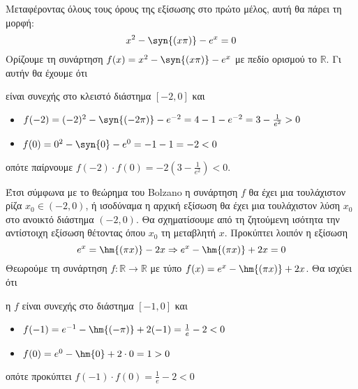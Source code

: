 \documentclass[11pt,a4paper]{article}
\begin{document}
Μεταφέροντας όλους τους όρους της εξίσωσης στο πρώτο μέλος, αυτή θα πάρει τη μορφή:
\[ x^2-\syn{(x\pi)}-e^x=0 \]
Ορίζουμε τη συνάρτηση $ f(x)=x^2-\syn{(x\pi)}-e^x $ με πεδίο ορισμού το $ \mathbb{R} $. Γι αυτήν θα έχουμε ότι
\begin{rlist}
\item είναι συνεχής στο κλειστό διάστημα $ [-2,0] $ και
\item \begin{itemize}
\item $ f(-2)=(-2)^2-\syn{(-2\pi)}-e^{-2}=4-1-e^{-2}=3-\frac{1}{e^2}>0 $
\item $ f(0)=0^2-\syn{0}-e^0=-1-1=-2<0 $
\end{itemize}
οπότε παίρνουμε $ f(-2)\cdot f(0)=-2\left(3-\frac{1}{e^2} \right)<0 $.
\end{rlist}
Έτσι σύμφωνα με το θεώρημα του Bolzano η συνάρτηση $ f $ θα έχει μια τουλάχιστον ρίζα $ x_0\in(-2,0) $, ή ισοδύναμα η αρχική εξίσωση θα έχει μια τουλάχιστον λύση $ x_0 $ στο ανοικτό διάστημα $ (-2,0) $.
Θα σχηματίσουμε από τη ζητούμενη ισότητα την αντίστοιχη εξίσωση θέτοντας όπου $ x_0 $ τη μεταβλητή $ x $. Προκύπτει λοιπόν η εξίσωση
\[ e^{x}=\hm{(\pi x)}-2x\Rightarrow e^{x}-\hm{(\pi x)}+2x=0 \]
Θεωρούμε τη συνάρτηση $ f:\mathbb{R}\to\mathbb{R} $ με τύπο $ f(x)=e^{x}-\hm{(\pi x)}+2x $. Θα ισχύει ότι
\begin{rlist}
\item η $ f $ είναι συνεχής στο διάστημα $ [-1,0] $ και
\item \begin{itemize}
\item $ f(-1)=e^{-1}-\hm{(-\pi)}+2(-1)=\frac{1}{e}-2<0 $
\item $ f(0)=e^0-\hm{0}+2\cdot 0=1>0 $
\end{itemize}
οπότε προκύπτει $ f(-1)\cdot f(0)=\frac{1}{e}-2<0 $
\end{rlist}
\end{document}
